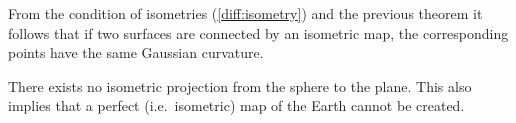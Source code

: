     \begin{property}
        From the condition of isometries (\cref{diff:isometry}) and the previous theorem it follows that if two surfaces are connected by an isometric map, the corresponding points have the same Gaussian curvature.
    \end{property}
    \begin{result}
        There exists no isometric projection from the sphere to the plane. This also implies that a perfect (i.e.~isometric) map of the Earth cannot be created.
    \end{result}